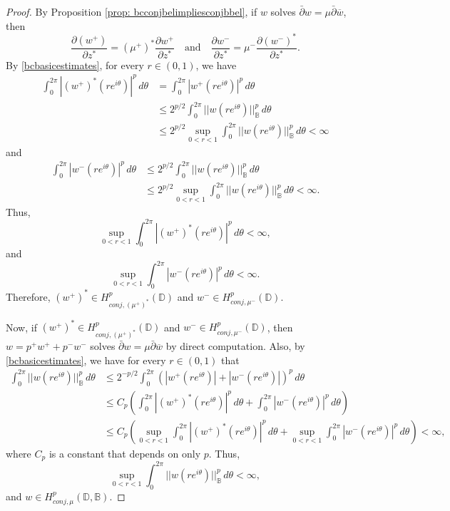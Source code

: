 \documentclass[12pt,reqno]{amsart}
\theoremstyle{definition}
\theoremstyle{remark}
\newcommand{\p}{\partial}
\newcommand{\dbar}{\bar\partial}
\newcommand{\bc}{\mathbb{B}}
\newcommand{\disk}{\mathbb{D}}
\begin{document}
\begin{proof} By Proposition \ref{prop: bcconjbelimpliesconjbbel}, if $w$ solves $\dbar w = \mu \dbar \overline{w}$, then
    \[
        \frac{\p (w^+)}{\p z^*} = (\mu^+)^* \frac{\p w^+}{\p z^*}
    \quad \text{and} \quad
        \frac{\p w^-}{\p z^*} = \mu^- \frac{\p (w^-)^*}{\p z^*}.
    \]
    By \eqref{bcbasicestimates}, for every $r \in (0,1)$, we have 
    \begin{align*}
         \int_0^{2\pi} |(w^+)^*(re^{i\theta})|^p \,d\theta
         &=
        \int_0^{2\pi} |w^+(re^{i\theta})|^p \,d\theta\\
        &\leq 2^{p/2}\int_0^{2\pi} ||w(re^{i\theta})||_\bc^p \,d\theta \\
        &\leq 2^{p/2} \sup_{0 < r< 1} \int_0^{2\pi} ||w(re^{i\theta})||_\bc^p \,d\theta< \infty
    \end{align*}
    and 
    \begin{align*}
          \int_0^{2\pi} |w^-(re^{i\theta})|^p \,d\theta 
         &\leq 2^{p/2}\int_0^{2\pi} ||w(re^{i\theta})||_\bc^p \,d\theta \\
         &\leq 2^{p/2}\sup_{0 < r < 1}\int_0^{2\pi} ||w(re^{i\theta})||_\bc^p \,d\theta < \infty.
    \end{align*}
    Thus, 
    \[
        \sup_{0 < r < 1}  \int_0^{2\pi} |(w^+)^*(re^{i\theta})|^p \,d\theta < \infty,
    \]
    and
    \[
        \sup_{0 < r < 1}\int_0^{2\pi} |w^-(re^{i\theta})|^p \,d\theta < \infty.
    \]
    Therefore, $(w^+)^* \in H^p_{conj, (\mu^+)^*}(\disk)$ and $w^- \in H^p_{conj,\mu^-}(\disk)$.

    Now, if $(w^+)^* \in H^p_{conj, (\mu^+)^*}(\disk)$ and $w^- \in H^p_{conj,\mu^-}(\disk)$, then $w = p^+ w^+ + p^- w^-$ solves $\dbar w = \mu \dbar \overline{w}$ by direct computation. Also, by \eqref{bcbasicestimates}, we have for every $r \in (0,1)$ that 
    \begin{align*}
        \int_0^{2\pi} ||w(re^{i\theta})||_\bc^p \,d\theta 
        &\leq 2^{-p/2} \int_0^{2\pi} (|w^+(re^{i\theta})|+|w^-(re^{i\theta})|)^p\,d\theta \\
        &\leq C_p \left( \int_0^{2\pi} |(w^+)^*(re^{i\theta})|^p \,d\theta + \int_0^{2\pi} |w^-(re^{i\theta})|^p\,d\theta\right) \\
        &\leq C_p \left( \sup_{0 < r < 1}\int_0^{2\pi} |(w^+)^*(re^{i\theta})|^p \,d\theta + \sup_{0 < r < 1}\int_0^{2\pi} |w^-(re^{i\theta})|^p\,d\theta\right) < \infty,
    \end{align*}
    where $C_p$ is a constant that depends on only $p$. Thus, 
    \[
        \sup_{0 < r < 1}\int_0^{2\pi} ||w(re^{i\theta})||_\bc^p \,d\theta < \infty,
    \]
    and $w \in H^p_{conj,\mu}(\disk,\bc)$. 
\end{proof}
\end{document}
